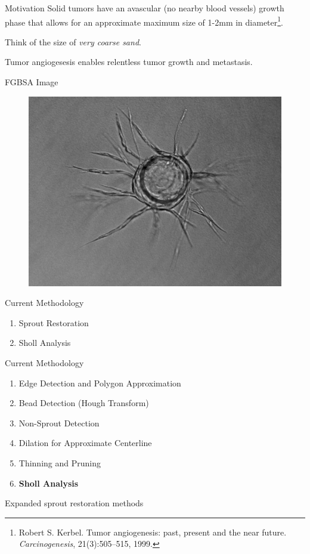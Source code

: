 \documentclass{beamer}
\begin{document}
\begin{frame}{Motivation}
	Solid tumors have an avascular (no nearby blood vessels) growth phase
	that allows for an approximate maximum size of 1-2mm in
	diameter\footnote{Robert S. Kerbel. Tumor angiogenesis: past, present
	and the near future. \emph{Carcinogenesis}, 21(3):505–515, 1999.}.

	\pause
	\vspace{2em}
	Think of the size of \emph{very coarse sand}.
	
	\pause
	\vspace{2em}
	Tumor angiogesesis enables relentless tumor growth and metastasis.
\end{frame}

\begin{frame}{FGBSA Image}
	\begin{figure}
		\centering
		\includegraphics[width=\textwidth]{images/mono}
	\end{figure}
\end{frame}

\begin{frame}{Current Methodology}
	\begin{enumerate}
		\item Sprout Restoration
		\item Sholl Analysis
	\end{enumerate}
\end{frame}

\begin{frame}{Current Methodology}
	\begin{enumerate}
		\item Edge Detection and Polygon Approximation
		\item Bead Detection (Hough Transform)
		\item Non-Sprout Detection
		\item Dilation for Approximate Centerline
		\item Thinning and Pruning
		\item \textbf{Sholl Analysis}
	\end{enumerate}

	Expanded sprout restoration methods
\end{frame}
\end{document}
